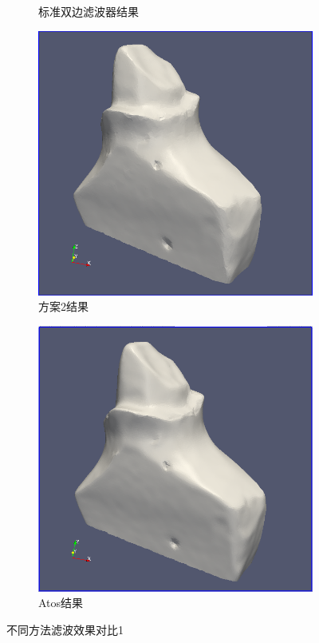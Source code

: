 \documentclass{article}
\theoremstyle{definition}
\theoremstyle{remark}
\begin{document}
\begin{figure}[H]
\begin{subfigure}[b]{0.5\textwidth}
        \caption[basic]{标准双边滤波器结果}
        \end{subfigure}
        \begin{subfigure}[b]{0.5\textwidth}
        \includegraphics[width=\textwidth]{v2_1}
        \caption[our]{方案2结果}
        \end{subfigure}
        \begin{subfigure}[b]{0.5\textwidth}
	\includegraphics[width=\textwidth]{atos_1}
        \caption[atos]{Atos结果}
        \end{subfigure}
        \caption[不同方法滤波效果对比]
	{不同方法滤波效果对比1}
\end{figure}
\end{document}
